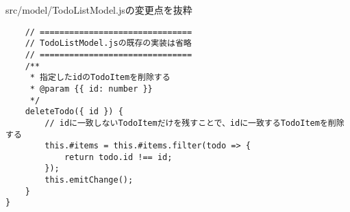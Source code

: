 \begin{listtitle}
src/model/TodoListModel.jsの変更点を抜粋
\end{listtitle}
\begin{lstlisting}
    // ===============================
    // TodoListModel.jsの既存の実装は省略
    // ===============================
    /**
     * 指定したidのTodoItemを削除する
     * @param {{ id: number }}
     */
    deleteTodo({ id }) {
        // idに一致しないTodoItemだけを残すことで、idに一致するTodoItemを削除する
        this.#items = this.#items.filter(todo => {
            return todo.id !== id;
        });
        this.emitChange();
    }
}
\end{lstlisting}
\listend

